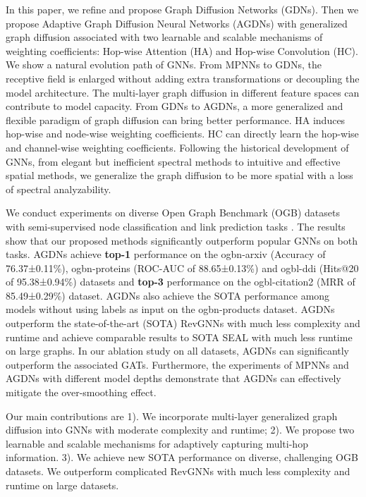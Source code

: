 \documentclass{article}
\begin{document}
In this paper, we refine and propose Graph Diffusion Networks (GDNs). Then we propose Adaptive Graph Diffusion Neural Networks (AGDNs) with generalized graph diffusion associated with two learnable and scalable mechanisms of weighting coefficients: Hop-wise Attention (HA) and Hop-wise Convolution (HC). We show a natural evolution path of GNNs. From MPNNs to GDNs, the receptive field is enlarged without adding extra transformations or decoupling the model architecture. The multi-layer graph diffusion in different feature spaces can contribute to model capacity. From GDNs to AGDNs, a more generalized and flexible paradigm of graph diffusion can bring better performance. HA induces hop-wise and node-wise weighting coefficients. HC can directly learn the hop-wise and channel-wise weighting coefficients. Following the historical development of GNNs, from elegant but inefficient spectral methods to intuitive and effective spatial methods, we generalize the graph diffusion to be more spatial with a loss of spectral analyzability. 


We conduct experiments on diverse Open Graph Benchmark (OGB) \cite{hu2020open} datasets with semi-supervised node classification and link prediction tasks \cite{hu2020open}. The results show that our proposed methods significantly outperform popular GNNs on both tasks. AGDNs achieve \textbf{top-1} performance on the ogbn-arxiv (Accuracy of 76.37±0.11\%), ogbn-proteins (ROC-AUC of 88.65±0.13\%) and ogbl-ddi (Hits@20 of 95.38±0.94\%) datasets and \textbf{top-3} performance on the ogbl-citation2 (MRR of 85.49±0.29\%) dataset. AGDNs also achieve the SOTA performance among models without using labels as input on the ogbn-products dataset. AGDNs outperform the state-of-the-art (SOTA) RevGNNs with much less complexity and runtime and achieve comparable results to SOTA SEAL with much less runtime on large graphs. In our ablation study on all datasets, AGDNs can significantly outperform the associated GATs. Furthermore, the experiments of MPNNs and AGDNs with different model depths demonstrate that AGDNs can effectively mitigate the over-smoothing effect.

Our main contributions are 1). We incorporate multi-layer generalized graph diffusion into GNNs with moderate complexity and runtime; 2). We propose two learnable and scalable mechanisms for adaptively capturing multi-hop information. 3). We achieve new SOTA performance on diverse, challenging OGB datasets. We outperform complicated RevGNNs with much less complexity and runtime on large datasets.
\end{document}
